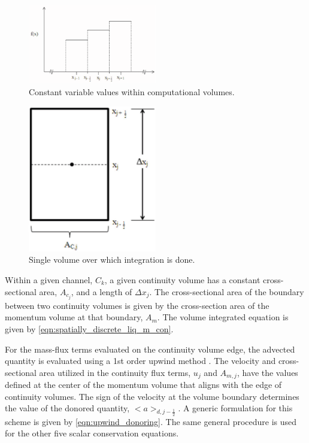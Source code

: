 \begin{figure}[ht]
\begin{center}
\includegraphics[width=0.5\textwidth]{images/constant_value.eps}
\end{center}
\caption{Constant variable values within computational volumes.}
\label{fig:constant_value}
\end{figure}


\begin{figure}[h!t]
\begin{center}
\includegraphics[width=0.5\textwidth]{images/single_volume.eps}
\end{center}
\caption{Single volume over which integration is done.}
\label{fig:single_volume}
\end{figure}

Within a given channel, $C_k$, a given continuity volume has a constant cross-sectional area, $A_{c_{j}}$, and a length of $\Delta x_{j}$.
The cross-sectional area of the boundary between two continuity volumes is given by the cross-section area of the momentum volume at that boundary, $A_{m}$.
The volume integrated equation is given by \eqref{eqn:spatially_discrete_liq_m_con}.

For the mass-flux terms evaluated on the continuity volume edge, the advected quantity is evaluated using a 1st order upwind method \cite{Tannehill1997}.
The velocity and cross-sectional area utilized in the continuity flux terms, $u_j$ and $A_{m,j}$, have the values defined at the center of the momentum volume that aligns with the edge of continuity volumes.
The sign of the velocity at the volume boundary determines the value of the donored quantity, $<a>_{d,j-\frac{1}{2}}$.
A generic formulation for this scheme is given by \eqref{eqn:upwind_donoring}.
The same general procedure is used for the other five scalar conservation equations.

